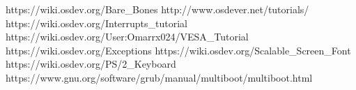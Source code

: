 \cleardoublepage

\begin{thebibliography}{99}
		 https://wiki.osdev.org/Bare\_Bones
		 http://www.osdever.net/tutorials/
		 https://wiki.osdev.org/Interrupts\_tutorial
		 https://wiki.osdev.org/User:Omarrx024/VESA\_Tutorial
		 https://wiki.osdev.org/Exceptions
		 https://wiki.osdev.org/Scalable\_Screen\_Font
		 https://wiki.osdev.org/PS/2\_Keyboard
		 https://www.gnu.org/software/grub/manual/multiboot/multiboot.html
	\end{thebibliography}
